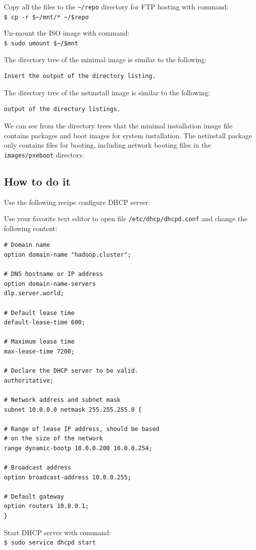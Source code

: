 Copy all the files to the \verb|~/repo| directory for FTP hosting with command: \\
\verb|$ cp -r $~/mnt/* ~/$repo|

Un-mount the ISO image with command: \\
\verb|$ sudo umount $~/$mnt|

The directory tree of the minimal image is similar to the following:
\begin{verbatim}
Insert the output of the directory listing.
\end{verbatim}

The directory tree of the netinstall image is similar to the following:
\begin{verbatim}
output of the directory listings.
\end{verbatim}
We can see from the directory trees that the minimal installation image file contains packages and boot images for system installation. The netinstall package only contains files for booting, including network booting files in the \verb|images/pxeboot| directory.

\subsection*{How to do it}
Use the following recipe configure DHCP server:

Use your favorite text editor to open file \verb|/etc/dhcp/dhcpd.conf| and change the following content:
\lstset{style=bashstyle}
\begin{lstlisting}
# Domain name
option domain-name "hadoop.cluster";

# DNS hostname or IP address
option domain-name-servers
dlp.server.world;

# Default lease time
default-lease-time 600;

# Maximum lease time
max-lease-time 7200;

# Declare the DHCP server to be valid.
authoritative;

# Network address and subnet mask
subnet 10.0.0.0 netmask 255.255.255.0 {

# Range of lease IP address, should be based
# on the size of the network
range dynamic-bootp 10.0.0.200 10.0.0.254;

# Broadcast address
option broadcast-address 10.0.0.255;

# Default gateway
option routers 10.0.0.1;
}
\end{lstlisting}

Start DHCP server with command: \\
\verb|$ sudo service dhcpd start|


